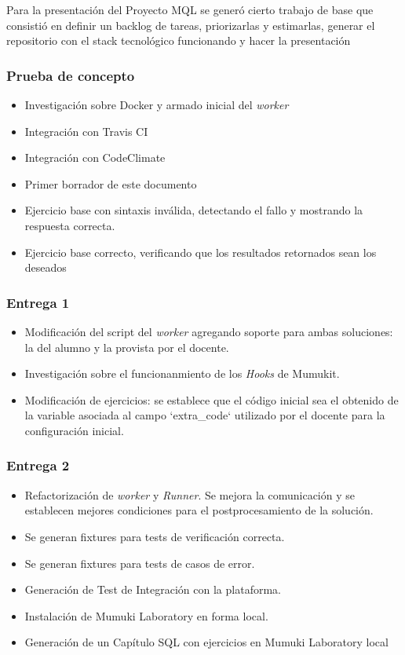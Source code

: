 Para la presentación del Proyecto MQL se generó cierto
trabajo de base que consistió en definir un backlog de tareas,
priorizarlas y estimarlas, generar el repositorio con
el stack tecnológico funcionando y hacer la presentación

\subsubsection{Prueba de concepto}

\begin{itemize}
    \item Investigación sobre Docker y armado inicial del \textit{worker}
    \item Integración con Travis CI
    \item Integración con CodeClimate
    \item Primer borrador de este documento
    \item Ejercicio base con sintaxis inválida, detectando el fallo
          y mostrando la respuesta correcta.
    \item Ejercicio base correcto, verificando que los
          resultados retornados sean los deseados
\end{itemize}

\subsubsection{Entrega 1}

\begin{itemize}
    \item Modificación del script del \textit{worker} agregando soporte
    para ambas soluciones: la del alumno y la provista por el docente.
    \item Investigación sobre el funcionanmiento de los \textit{Hooks} de Mumukit.
    \item Modificación de ejercicios: se establece que el código inicial
    sea el obtenido de la variable asociada al campo `extra\_code`
    utilizado por el docente para la configuración inicial.
\end{itemize}

\subsubsection{Entrega 2}

\begin{itemize}
    \item Refactorización de \textit{worker} y \textit{Runner}.
    Se mejora la comunicación y se establecen mejores condiciones para el
    postprocesamiento de la solución.
    \item Se generan fixtures para tests de verificación correcta.
    \item Se generan fixtures para tests de casos de error.
    \item Generación de Test de Integración con la plataforma.
    \item Instalación de Mumuki Laboratory en forma local.
    \item Generación de un Capítulo SQL con ejercicios en Mumuki Laboratory local
\end{itemize}

